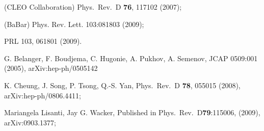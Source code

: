 \documentclass[aps,prl,nofootinbib,superscriptaddress]{revtex4}
\begin{document}
\begin{thebibliography}{99}
 (CLEO Collaboration) Phys.\ Rev.\ D {\bf 76}, 117102 (2007); 

 (BaBar) Phys. Rev. Lett. 103:081803 (2009);

 PRL 103, 061801 (2009).

 G. Belanger, F. Boudjema, C. Hugonie, A. Pukhov, A. Semenov, JCAP 0509:001 (2005), arXiv:hep-ph/0505142

 K. Cheung, J. Song, P. Tsong, Q.-S. Yan, Phys.\ Rev.\ D {\bf 78}, 055015 (2008), arXiv:hep-ph/0806.4411; 

 Mariangela Lisanti, Jay G. Wacker, Published in Phys.\ Rev.\ D{\bf 79}:115006, (2009), arXiv:0903.1377;


  
%
%

    
\end{thebibliography}
\end{document}
